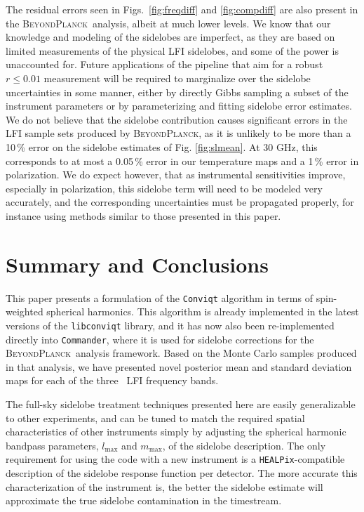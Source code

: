 \documentclass[twocolumn]{aa}
\def\healpix{\texttt{HEALPix}}
\def\commander{\texttt{Commander}}
\newcommand{\BP}{\textsc{BeyondPlanck}}
\begin{document}
The residual errors seen in Figs.~\ref{fig:freqdiff} and \ref{fig:compdiff} are also present in the \BP\ analysis, albeit at much lower levels. We know that our knowledge and modeling of the sidelobes are imperfect, as they are based on limited measurements of the physical LFI sidelobes, and some of the power is unaccounted for. Future applications of the pipeline that aim for a robust $r\le 0.01$ measurement will be required to marginalize over the sidelobe uncertainties in some manner, either by directly Gibbs sampling a subset of the instrument parameters or by parameterizing and fitting sidelobe error estimates. We do not believe that the sidelobe contribution causes significant errors in the LFI sample sets produced by \BP, as it is unlikely to be more than a 10\,\% error on the sidelobe estimates of Fig. \ref{fig:slmean}. At 30 GHz, this corresponds to at most a 0.05\,\% error in our temperature maps and a 1\,\% error in polarization. We do expect however, that as instrumental sensitivities improve, especially in polarization, this sidelobe term will need to be modeled very accurately, and the corresponding uncertainties must be propagated properly, for instance using methods similar to those presented in this paper.

\section{Summary and Conclusions}
\label{sec:conclusions}

This paper presents a formulation of the \texttt{Conviqt} algorithm in terms of spin-weighted spherical harmonics. This algorithm is already implemented in the latest versions of the \texttt{libconviqt} library, and it has now also been re-implemented directly into \commander, where it is used for sidelobe corrections for the \BP\ analysis framework. Based on the Monte Carlo samples produced in that analysis, we have presented novel posterior mean and standard deviation maps for each of the three \Planck\ LFI frequency bands.

The full-sky sidelobe treatment techniques presented here are easily generalizable to other experiments, and can be tuned to match the required spatial characteristics of other instruments simply by adjusting the spherical harmonic bandpass parameters, $l_\mathrm{max}$ and $m_\mathrm{max}$, of the sidelobe description. The only requirement for using the code with a new instrument is a \healpix-compatible description of the sidelobe response function per detector. The more accurate this characterization of the instrument is, the better the sidelobe estimate will approximate the true sidelobe contamination in the timestream.
\end{document}
